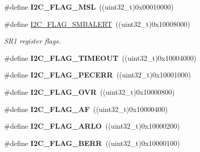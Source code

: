 \begin{DoxyCompactItemize}
\item 
\hypertarget{group__I2C__flags__definition_gae8e6a404cbfd70420d278d520304f368}{
\#define {\bfseries I2C\_\-FLAG\_\-MSL}~((uint32\_\-t)0x00010000)}
\label{group__I2C__flags__definition_gae8e6a404cbfd70420d278d520304f368}

\item 
\hypertarget{group__I2C__flags__definition_ga4e1d7cd1574d03ba501c27483300c1be}{
\#define \hyperlink{group__I2C__flags__definition_ga4e1d7cd1574d03ba501c27483300c1be}{I2C\_\-FLAG\_\-SMBALERT}~((uint32\_\-t)0x10008000)}
\label{group__I2C__flags__definition_ga4e1d7cd1574d03ba501c27483300c1be}

\begin{DoxyCompactList}\small\item\em SR1 register flags. \item\end{DoxyCompactList}\item 
\hypertarget{group__I2C__flags__definition_ga89c8d5d8ccc77a8619fafe9b39d1cc74}{
\#define {\bfseries I2C\_\-FLAG\_\-TIMEOUT}~((uint32\_\-t)0x10004000)}
\label{group__I2C__flags__definition_ga89c8d5d8ccc77a8619fafe9b39d1cc74}

\item 
\hypertarget{group__I2C__flags__definition_ga6c7addb6413f165f42bcc87506ea8467}{
\#define {\bfseries I2C\_\-FLAG\_\-PECERR}~((uint32\_\-t)0x10001000)}
\label{group__I2C__flags__definition_ga6c7addb6413f165f42bcc87506ea8467}

\item 
\hypertarget{group__I2C__flags__definition_gab579673c8ac920db199aa7f18e547fb3}{
\#define {\bfseries I2C\_\-FLAG\_\-OVR}~((uint32\_\-t)0x10000800)}
\label{group__I2C__flags__definition_gab579673c8ac920db199aa7f18e547fb3}

\item 
\hypertarget{group__I2C__flags__definition_ga2f89dbba9b964e6ade1480705e7a97d4}{
\#define {\bfseries I2C\_\-FLAG\_\-AF}~((uint32\_\-t)0x10000400)}
\label{group__I2C__flags__definition_ga2f89dbba9b964e6ade1480705e7a97d4}

\item 
\hypertarget{group__I2C__flags__definition_gae1e67936f4780e42b8bbe04ac9c20a7b}{
\#define {\bfseries I2C\_\-FLAG\_\-ARLO}~((uint32\_\-t)0x10000200)}
\label{group__I2C__flags__definition_gae1e67936f4780e42b8bbe04ac9c20a7b}

\item 
\hypertarget{group__I2C__flags__definition_ga0454176b6ddd5c402abc3ef5953a21ad}{
\#define {\bfseries I2C\_\-FLAG\_\-BERR}~((uint32\_\-t)0x10000100)}
\label{group__I2C__flags__definition_ga0454176b6ddd5c402abc3ef5953a21ad}


\end{DoxyCompactItemize}
